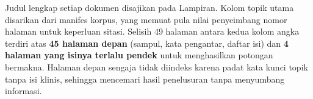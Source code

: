 \noindent\footnotesize Judul lengkap setiap dokumen disajikan pada Lampiran. Kolom topik utama disarikan dari manifes korpus, yang memuat pula nilai penyeimbang nomor halaman untuk keperluan sitasi. Selisih 49 halaman antara kedua kolom angka terdiri atas \textbf{45 halaman depan} (sampul, kata pengantar, daftar isi) dan \textbf{4 halaman yang isinya terlalu pendek} untuk menghasilkan potongan bermakna. Halaman depan sengaja tidak diindeks karena padat kata kunci topik tanpa isi klinis, sehingga mencemari hasil penelusuran tanpa menyumbang informasi.

